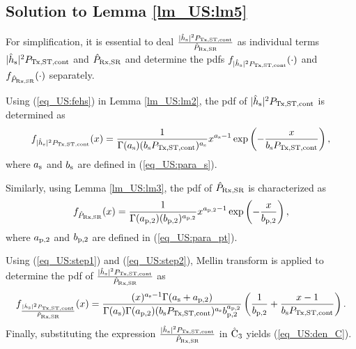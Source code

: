 \subsection{Solution to Lemma \ref{lm_US:lm5}} \label{ap:one}
\begin{IEEEproof}[Solution]
For simplification, it is essential to deal $\frac{|\hat{h}_{\text{s}}|^2 P_{\text{Tx,ST,cont}}}{\hat{P}_{\text{Rx,SR}}}$ as individual terms $|\hat{h}_{\text{s}}|^2 P_{\text{Tx,ST,cont}}$ and $\hat{P}_{\text{Rx,SR}}$ and determine the pdfs $f_{|\hat{h}_{\text{s}}|^2 P_{\text{Tx,ST,cont}}}(\cdot)$ and $f_{\hat{P}_{\text{Rx,SR}}}(\cdot)$ separately.

Using (\ref{eq_US:fehs}) in Lemma \ref{lm_US:lm2}, the pdf of $|\hat{h}_{\text{s}}|^2 P_{\text{Tx,ST,cont}}$ is determined as
\begin{align}
f_{|\hat{h}_{\text{s}}|^2 P_{\text{Tx,ST,cont}}}(x) = \frac{1}{\Gamma(a_{\text{s}}) (b_{\text{s}} P_{\text{Tx,ST,cont}})^{a_{\text{s}}}} x^{a_{\text{s}} - 1} \exp\left( - \frac{x}{ b_{\text{s}} P_{\text{Tx,ST,cont}}} \right), \label{eq_US:step1} 
\end{align}
where $a_{\text{s}}$ and $b_{\text{s}}$ are defined in (\ref{eq_US:para_s}).

Similarly, using Lemma \ref{lm_US:lm3}, the pdf of $\hat{P}_{\text{Rx,SR}}$ is characterized as
\begin{align}
f_{\hat{P}_{\text{Rx,SR}}}(x) = \frac{1}{\Gamma(a_{\text{p,2}}) (b_{\text{p,2}})^{a_{\text{p,2}}}} x^{a_{\text{p,2}} - 1} \exp\left( - \frac{x}{ b_{\text{p,2}}} \right), \label{eq_US:step2} 
\end{align}
where $a_{\text{p,2}}$ and $b_{\text{p,2}}$ are defined in (\ref{eq_US:para_pt}).

Using (\ref{eq_US:step1}) and (\ref{eq_US:step2}), Mellin transform \cite{NIST} is applied to determine the pdf of $\frac{|\hat{h}_{\text{s}}|^2 P_{\text{Tx,ST,cont}}}{\hat{P}_{\text{Rx,SR}}}$ as
\begin{align}
f_{\frac{|\hat{h}_{\text{s}}|^2 P_{\text{Tx,ST,cont}}}{\hat{P}_{\text{Rx,SR}}}}(x) = \frac{(x)^{a_{\text{s}} - 1} \Gamma(a_{\text{s}} + a_{\text{p,2}})}{\Gamma(a_{\text{s}}) \Gamma(a_{\text{p,2}}) (b_{\text{s}} P_{\text{Tx,ST,cont}}) ^{a_{\text{s}}} b_{\text{p,2}}^{a_{\text{p,2}}}} \left(\frac{1}{b_{\text{p,2}}} + \frac{x - 1}{b_{\text{s}} P_{\text{Tx,ST,cont}}}\right).
\end{align}
Finally, substituting the expression $\frac{|\hat{h}_{\text{s}}|^2 P_{\text{Tx,ST,cont}}}{\hat{P}_{\text{Rx,SR}}}$ in $\hat{\text{{C}}}_{\text{3}}$ yields (\ref{eq_US:den_C}).
\end{IEEEproof}
